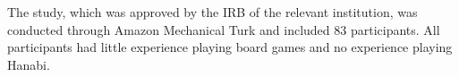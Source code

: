 \documentclass[letterpaper]{article} %
\begin{document}









The study, which was approved by the IRB of the relevant institution, was conducted through Amazon Mechanical Turk and included 83 participants. All participants had little experience playing board games and no experience playing Hanabi.
\end{document}
